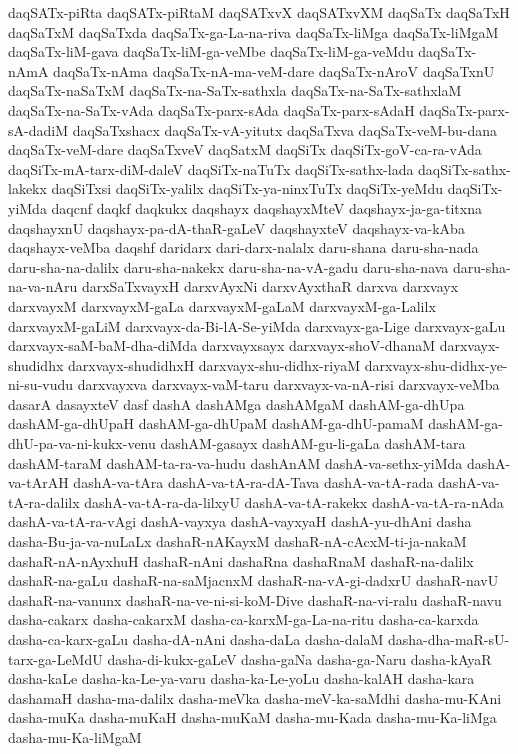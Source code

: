{daqSATx-piRta
daqSATx-piRtaM
daqSATxvX
daqSATxvXM
daqSaTx
daqSaTxH
daqSaTxM
daqSaTxda
daqSaTx-ga-La-na-riva
daqSaTx-liMga
daqSaTx-liMgaM
daqSaTx-liM-gava
daqSaTx-liM-ga-veMbe
daqSaTx-liM-ga-veMdu
daqSaTx-nAmA
daqSaTx-nAma
daqSaTx-nA-ma-veM-dare
daqSaTx-nAroV
daqSaTxnU
daqSaTx-naSaTxM
daqSaTx-na-SaTx-sathxla
daqSaTx-na-SaTx-sathxlaM
daqSaTx-na-SaTx-vAda
daqSaTx-parx-sAda
daqSaTx-parx-sAdaH
daqSaTx-parx-sA-dadiM
daqSaTxshacx
daqSaTx-vA-yitutx
daqSaTxva
daqSaTx-veM-bu-dana
daqSaTx-veM-dare
daqSaTxveV
daqSatxM
daqSiTx
daqSiTx-goV-ca-ra-vAda
daqSiTx-mA-tarx-diM-daleV
daqSiTx-naTuTx
daqSiTx-sathx-lada
daqSiTx-sathx-lakekx
daqSiTxsi
daqSiTx-yalilx
daqSiTx-ya-ninxTuTx
daqSiTx-yeMdu
daqSiTx-yiMda
daqcnf
daqkf
daqkukx
daqshayx
daqshayxMteV
daqshayx-ja-ga-titxna
daqshayxnU
daqshayx-pa-dA-thaR-gaLeV
daqshayxteV
daqshayx-va-kAba
daqshayx-veMba
daqshf
daridarx
dari-darx-nalalx
daru-shana
daru-sha-nada
daru-sha-na-dalilx
daru-sha-nakekx
daru-sha-na-vA-gadu
daru-sha-nava
daru-sha-na-va-nAru
darxSaTxvayxH
darxvAyxNi
darxvAyxthaR
darxva
darxvayx
darxvayxM
darxvayxM-gaLa
darxvayxM-gaLaM
darxvayxM-ga-Lalilx
darxvayxM-gaLiM
darxvayx-da-Bi-lA-Se-yiMda
darxvayx-ga-Lige
darxvayx-gaLu
darxvayx-saM-baM-dha-diMda
darxvayxsayx
darxvayx-shoV-dhanaM
darxvayx-shudidhx
darxvayx-shudidhxH
darxvayx-shu-didhx-riyaM
darxvayx-shu-didhx-ye-ni-su-vudu
darxvayxva
darxvayx-vaM-taru
darxvayx-va-nA-risi
darxvayx-veMba
dasarA
dasayxteV
dasf
dashA
dashAMga
dashAMgaM
dashAM-ga-dhUpa
dashAM-ga-dhUpaH
dashAM-ga-dhUpaM
dashAM-ga-dhU-pamaM
dashAM-ga-dhU-pa-va-ni-kukx-venu
dashAM-gasayx
dashAM-gu-li-gaLa
dashAM-tara
dashAM-taraM
dashAM-ta-ra-va-hudu
dashAnAM
dashA-va-sethx-yiMda
dashA-va-tArAH
dashA-va-tAra
dashA-va-tA-ra-dA-Tava
dashA-va-tA-rada
dashA-va-tA-ra-dalilx
dashA-va-tA-ra-da-lilxyU
dashA-va-tA-rakekx
dashA-va-tA-ra-nAda
dashA-va-tA-ra-vAgi
dashA-vayxya
dashA-vayxyaH
dashA-yu-dhAni
dasha
dasha-Bu-ja-va-nuLaLx
dashaR-nAKayxM
dashaR-nA-cAcxM-ti-ja-nakaM
dashaR-nA-nAyxhuH
dashaR-nAni
dashaRna
dashaRnaM
dashaR-na-dalilx
dashaR-na-gaLu
dashaR-na-saMjacnxM
dashaR-na-vA-gi-dadxrU
dashaR-navU
dashaR-na-vanunx
dashaR-na-ve-ni-si-koM-Dive
dashaR-na-vi-ralu
dashaR-navu
dasha-cakarx
dasha-cakarxM
dasha-ca-karxM-ga-La-na-ritu
dasha-ca-karxda
dasha-ca-karx-gaLu
dasha-dA-nAni
dasha-daLa
dasha-dalaM
dasha-dha-maR-sU-tarx-ga-LeMdU
dasha-di-kukx-gaLeV
dasha-gaNa
dasha-ga-Naru
dasha-kAyaR
dasha-kaLe
dasha-ka-Le-ya-varu
dasha-ka-Le-yoLu
dasha-kalAH
dasha-kara
dashamaH
dasha-ma-dalilx
dasha-meVka
dasha-meV-ka-saMdhi
dasha-mu-KAni
dasha-muKa
dasha-muKaH
dasha-muKaM
dasha-mu-Kada
dasha-mu-Ka-liMga
dasha-mu-Ka-liMgaM
}
